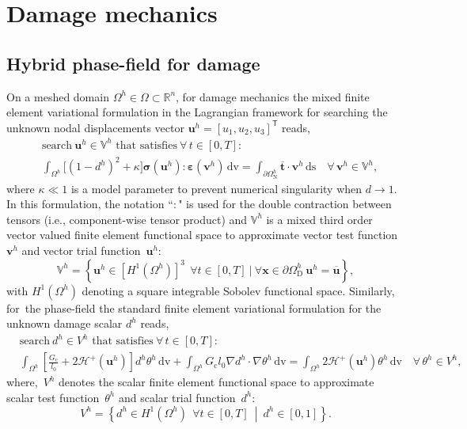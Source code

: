 \documentclass{report}
\newcommand{\bx}{\textbf{x}}
\newcommand{\bu}{\textbf{u}}
\newcommand{\bv}{\textbf{v}}
\newcommand{\bt}{\boldsymbol t}
\newcommand{\bgc}{G_{\text{c}}}
\newcommand{\buh}{\boldsymbol u^h}
\newcommand{\bvh}{\boldsymbol v^h}
\newcommand{\fih}{ d^h}
\newcommand{\ttah}{ \theta^h}
\newcommand{\sig}{\boldsymbol{\sigma}}
\newcommand{\eps}{\boldsymbol{\varepsilon}}
\newcommand{\dv}{\mathrm{d}\text{v}}
\newcommand{\ds}{\mathrm{d}\text{s}}
\begin{document}
\section{Damage mechanics}
\subsection{Hybrid phase-field for damage}
On a meshed domain $\Omega^h\in\Omega\subset\mathbb{R}^n$, for damage mechanics the mixed finite element variational formulation in the Lagrangian framework for searching the unknown nodal displacements vector $\bu^h=[u_1,u_2,u_3]^\mathsf{T}$ reads,
%
%
\begin{equation}\label{Eq:VarfU}
\begin{aligned}
&\text{search}~\buh\in\mathbb{V}^h \text{~that satisfies}~\forall\, t\in[0,T]:\\
&\int_{\Omega^h}\big[(1-d^h)^2 + \kappa \big]\sig(\buh) : \eps(\bvh) \,\dv= \int_{\partial\Omega^h_\text{N}} \overline{\bt}\cdot\bvh \,\ds \quad\forall\,\bv^h\in\mathbb{V}^h,
\end{aligned}
\end{equation}
where $\kappa\ll1$ is a model parameter to prevent numerical singularity when $d \to 1$.
In this formulation, the notation ``$:$" is used for the double contraction between tensors (i.e., component-wise tensor product) and $ \mathbb{V}^h $ is a  mixed third order vector valued finite element functional space to approximate vector test function~$\bvh$ and vector trial function~$\buh$:
\begin{equation}
\mathbb{V}^h=\left\{ \bu^h\in [ {H}^1(\Omega^h) ]^3~~\forall t\in[0,T]~|~ \forall \bx\in\partial\Omega^h_{\text{D}}~\buh=\overline{\bu}\right\},
\end{equation}
%
with ${H}^1(\Omega^h)$ denoting a square integrable Sobolev functional space.
Similarly, for~the phase-field the standard finite element variational formulation for the unknown damage scalar $\fih$ reads, 
%
%
\begin{equation}
\begin{aligned}\label{Eq:VarfPhi}
&\text{search}~\fih\in{{V}}^h \text{~that satisfies}~\forall\, t\in[0,T]:\\
&\int_{\Omega^h}\left[ \frac{\bgc}{l_0} + 2 \mathcal{H}^{+}(\buh) \right]\fih\ttah\, \dv + \int_{\Omega^h} {\bgc}{l_0}\nabla\fih \cdot \nabla\ttah \, \dv= \int_{\Omega^h} 2\mathcal{H}^{+}(\buh)\ttah \, \dv\quad\forall\,\ttah\in{{V}}^h, 
\end{aligned}
\end{equation}
%
%
where,~${{V}}^h$ denotes the scalar finite element functional space to approximate scalar test function~$\ttah$ and scalar trial function~$\fih$:
\begin{equation}
{{V}}^h=\left\{\fih \in  {H}^1(\Omega^h)~~\forall t\in[0,T]~\middle|~\fih\in[0,1]  \right\}.
\end{equation}
\end{document}
